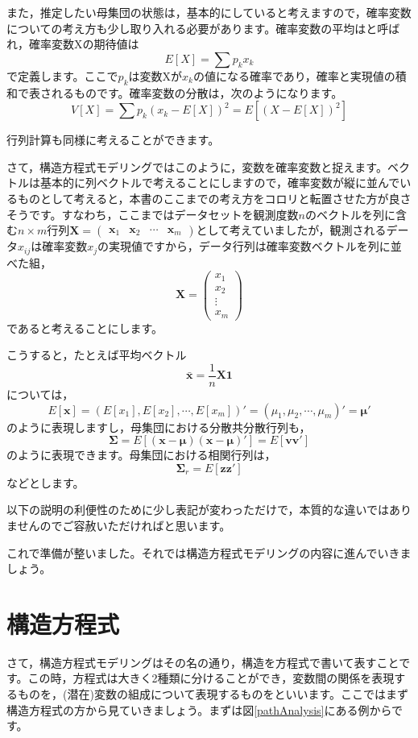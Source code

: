 \documentclass{ltjsbook}
\begin{document}
また，推定したい母集団の状態は，基本的にしていると考えますので，確率変数についての考え方も少し取り入れる必要があります。確率変数の平均はと呼ばれ，確率変数Xの期待値は
\[ E[X] = \sum p_k x_k \]
で定義します。ここで$p_k$は変数Xが$x_k$の値になる確率であり，確率と実現値の積和で表されるものです。確率変数の分散は，次のようになります。
\[ V[X] = \sum p_k(x_k - E[X])^2 = E[(X-E[X])^2] \]

行列計算も同様に考えることができます。

さて，構造方程式モデリングではこのように，変数を確率変数と捉えます。ベクトルは基本的に列ベクトルで考えることにしますので，確率変数が縦に並んでいるものとして考えると，本書のここまでの考え方をコロリと転置させた方が良さそうです。すなわち，ここまではデータセットを観測度数$n$のベクトルを列に含む$n \times m$行列$\bm{X} = \begin{pmatrix}\bm{x}_1 & \bm{x}_2 & \cdots &\bm{x}_m \end{pmatrix}$として考えていましたが，観測されるデータ$x_{ij}$は確率変数$x_j$の実現値ですから，データ行列は確率変数ベクトルを列に並べた組，
\[ \bm{X} = \begin{pmatrix} x_1 \\ x_2 \\ \vdots \\ x_m \end{pmatrix}\]
であると考えることにします。

こうすると，たとえば平均ベクトル
\[ \bar{\bm{x}} = \frac{1}{n}\bm{X}\bm{1} \]
については，
\[ E[\bm{x}] = (E[x_1],E[x_2],\cdots,E[x_m])' =(\mu_1,\mu_2,\cdots,\mu_m)' = \bm{\mu}' \]
のように表現しますし，母集団における分散共分散行列も，
\[ \bm{\Sigma} = E[(\bm{x}-\bm{\mu})(\bm{x}-\bm{\mu})'] = E[\bm{v}\bm{v}'] \]
のように表現できます。母集団における相関行列は，
\[ \bm{\Sigma}_r = E[\bm{z}\bm{z}']\]
などとします。

以下の説明の利便性のために少し表記が変わっただけで，本質的な違いではありませんのでご容赦いただければと思います。

これで準備が整いました。それでは構造方程式モデリングの内容に進んでいきましょう。

\section{構造方程式}
さて，構造方程式モデリングはその名の通り，構造を方程式で書いて表すことです。この時，方程式は大きく2種類に分けることができ，変数間の関係を表現するものを，(潜在)変数の組成について表現するものをといいます。ここではまず構造方程式の方から見ていきましょう。まずは図\ref{pathAnalysis}にある例からです。
\end{document}
